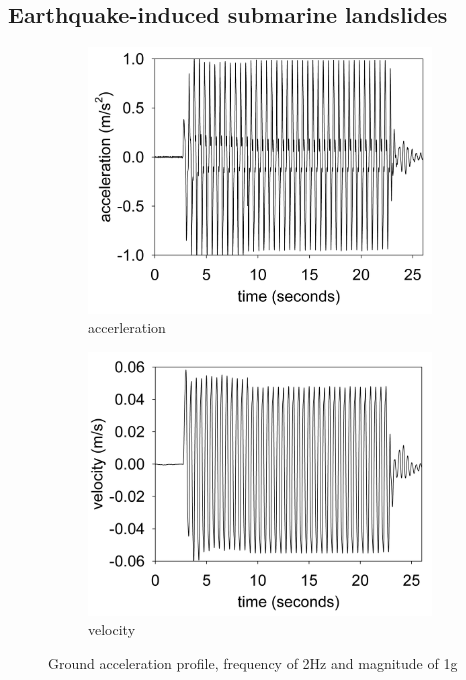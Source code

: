 \documentclass[preprint,12pt]{elsarticle}
\begin{document}
\subsection{\textsf{Earthquake-induced submarine landslides}}
%
%
\begin{figure}[h]
\center
\begin{subfigure}[c]{0.5\linewidth}
\includegraphics[width=\linewidth]{acer.jpg}
\caption{accerleration}
\end{subfigure}\hfill    
\begin{subfigure}[d]{0.5\linewidth}
\includegraphics[width=\linewidth]{vel.jpg}
\caption{velocity}
\label{velocity}
\end{subfigure}
\caption{Ground acceleration profile, frequency of 2Hz and magnitude of 1g}
\label{groundacceleration}
\end{figure}
\end{document}
